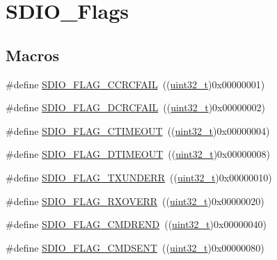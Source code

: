 \hypertarget{group___s_d_i_o___flags}{}\section{S\+D\+I\+O\+\_\+\+Flags}
\label{group___s_d_i_o___flags}
\subsection*{Macros}
\begin{DoxyCompactItemize}
\item 
\#define \hyperlink{group___s_d_i_o___flags_ga8ff1f3960378e05ec3c949940e1c49d0}{S\+D\+I\+O\+\_\+\+F\+L\+A\+G\+\_\+\+C\+C\+R\+C\+F\+A\+IL}~((\hyperlink{_p_e___types_8h_a33594304e786b158f3fb30289278f5af}{uint32\+\_\+t})0x00000001)
\item 
\#define \hyperlink{group___s_d_i_o___flags_ga6de936ea11cbc79444d519268ad9f9bd}{S\+D\+I\+O\+\_\+\+F\+L\+A\+G\+\_\+\+D\+C\+R\+C\+F\+A\+IL}~((\hyperlink{_p_e___types_8h_a33594304e786b158f3fb30289278f5af}{uint32\+\_\+t})0x00000002)
\item 
\#define \hyperlink{group___s_d_i_o___flags_ga7389f64ff6cfa4f459bf852b5faede30}{S\+D\+I\+O\+\_\+\+F\+L\+A\+G\+\_\+\+C\+T\+I\+M\+E\+O\+UT}~((\hyperlink{_p_e___types_8h_a33594304e786b158f3fb30289278f5af}{uint32\+\_\+t})0x00000004)
\item 
\#define \hyperlink{group___s_d_i_o___flags_ga2d2fd219dd9fea522862195ab9568345}{S\+D\+I\+O\+\_\+\+F\+L\+A\+G\+\_\+\+D\+T\+I\+M\+E\+O\+UT}~((\hyperlink{_p_e___types_8h_a33594304e786b158f3fb30289278f5af}{uint32\+\_\+t})0x00000008)
\item 
\#define \hyperlink{group___s_d_i_o___flags_gabd18f8e5d5387a38dccbe1bf28ae5dbc}{S\+D\+I\+O\+\_\+\+F\+L\+A\+G\+\_\+\+T\+X\+U\+N\+D\+E\+RR}~((\hyperlink{_p_e___types_8h_a33594304e786b158f3fb30289278f5af}{uint32\+\_\+t})0x00000010)
\item 
\#define \hyperlink{group___s_d_i_o___flags_gad49d60039e40d31b734cfacf90caa84f}{S\+D\+I\+O\+\_\+\+F\+L\+A\+G\+\_\+\+R\+X\+O\+V\+E\+RR}~((\hyperlink{_p_e___types_8h_a33594304e786b158f3fb30289278f5af}{uint32\+\_\+t})0x00000020)
\item 
\#define \hyperlink{group___s_d_i_o___flags_ga083531db75a1e4c05c47578763d53af1}{S\+D\+I\+O\+\_\+\+F\+L\+A\+G\+\_\+\+C\+M\+D\+R\+E\+ND}~((\hyperlink{_p_e___types_8h_a33594304e786b158f3fb30289278f5af}{uint32\+\_\+t})0x00000040)
\item 
\#define \hyperlink{group___s_d_i_o___flags_gac81f3837aac17a6aed7310a8ea460f17}{S\+D\+I\+O\+\_\+\+F\+L\+A\+G\+\_\+\+C\+M\+D\+S\+E\+NT}~((\hyperlink{_p_e___types_8h_a33594304e786b158f3fb30289278f5af}{uint32\+\_\+t})0x00000080)

\end{DoxyCompactItemize}
